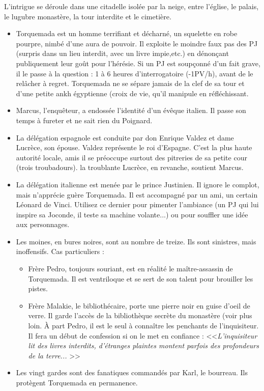 \documentclass[11pt,twoside,a4paper]{book}
\begin{document}
L'intrigue se d{\'e}roule dans une citadelle isol{\'e}e par la neige, entre l'{\'e}glise, le palais, le lugubre monast{\`e}re, la tour interdite et le cimeti{\`e}re.
\setlength\parindent{20pt}
\begin{itemize}
	\item Torquemada est un homme terrifiant et d{\'e}charn{\'e}, un squelette en robe pourpre, nimb{\'e} d'une aura de pouvoir. Il exploite le moindre faux pas des PJ (surpris dans un lieu interdit, avec un livre impie,etc.) en d{\'e}non\c{c}ant publiquement leur go{\^u}t pour l'h{\'e}r{\'e}sie. Si un PJ est soup\c{c}onn{\'e} d'un fait grave, il le passe {\`a} la question : 1 {\`a} 6 heures d'interrogatoire (-1PV/h), avant de le rel{\^a}cher {\`a} regret. Torquemada ne se s{\'e}pare jamais de la clef de sa tour et d'une petite ankh {\'e}gyptienne (croix de vie, qu'il manipule en r{\'e}fl{\'e}chissant.
	\item Marcus, l'enqu{\^e}teur, a endoss{\'e}e l'identit{\'e} d'un {\'e}v{\^e}que italien. Il passe son temps {\`a} fureter et ne sait rien du Poignard.
	\item La d{\'e}l{\'e}gation espagnole est conduite par don Enrique Valdez et dame Lucr{\`e}ce, son {\'e}pouse. Valdez repr{\'e}sente le roi d'Espagne. C'est la plus haute autorit{\'e} locale, amis il se pr{\'e}occupe surtout des pitreries de sa petite cour (trois troubadours). la troublante Lucr{\`e}ce, en revanche, soutient Marcus.
	\item La d{\'e}l{\'e}gation italienne est men{\'e}e par le prince Justinien. Il ignore le complot, mais n'appr{\'e}cie gu{\`e}re Torquemada. Il est accompagn{\'e} par un ami, un certain L{\'e}onard de Vinci. Utilisez ce dernier pour pimenter l'ambiance (un PJ qui lui inspire sa Joconde, il teste sa machine volante...) ou pour souffler une id{\'e}e aux personnages.
	\item Les moines, en bures noires, sont au nombre de treize. Ils sont sinistres, mais inoffensifs. Cas particuliers :
	\begin{itemize}
			\item Fr{\`e}re Pedro, toujours souriant, est en r{\'e}alit{\'e} le ma{\^i}tre-assassin de Torquemada. Il est ventriloque et se sert de son talent pour brouiller les pistes.
			\item Fr{\`e}re Malakie, le biblioth{\'e}caire, porte une pierre noir en guise d'oeil de verre. Il garde l'acc{\`e}s de la biblioth{\`e}que secr{\`e}te du monast{\`e}re (voir plus loin. {\`A} part Pedro, il est le seul {\`a} conna{\^i}tre les penchants de l'inquisiteur. Il fera un d{\'e}but de confession si on le met en confiance : <<\emph{L'inquisiteur lit des livres interdits, d'{\'e}tranges plaintes montent parfois des profondeurs de la terre... }>>
	\end{itemize}
	\item Les vingt gardes sont des fanatiques command{\'e}s par Karl, le bourreau. Ils prot{\`e}gent Torquemada en permanence.
\end{itemize}~\\
\setlength\parindent{0pt}
\end{document}
